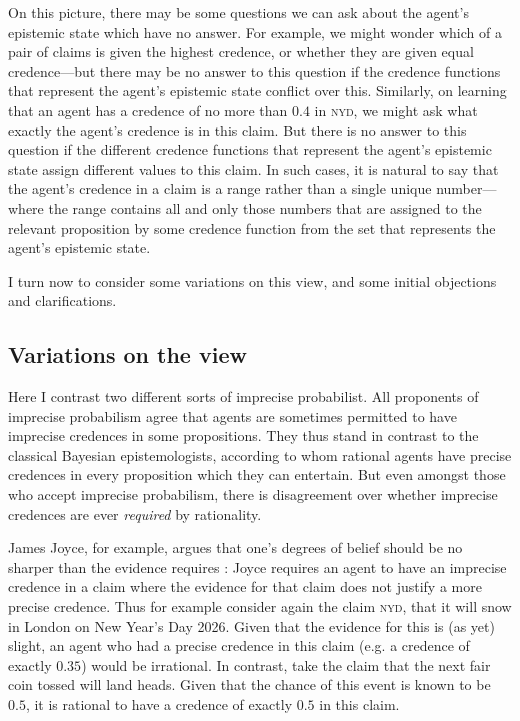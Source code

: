 On this picture, there may be some questions we can ask about the agent's epistemic state which have no answer. For example, we might wonder which of a pair of claims is given the highest credence, or whether they are given equal credence---but there may be no answer to this question if the credence functions that represent the agent's epistemic state conflict over this. Similarly, on learning that an agent has a credence of no more than $0.4$ in \textsc{nyd}, we might ask what exactly the agent's credence is in this claim. But there is no answer to this question if the different credence functions that represent the agent's epistemic state assign different values to this claim. In such cases, it is natural to say that the agent's credence in a claim is a range rather than a single unique number---where the range contains all and only those numbers that are assigned to the relevant proposition by some credence function from the set that represents the agent's epistemic state. 

I turn now to consider some variations on this view, and some initial objections and clarifications.

\subsection{Variations on the view}

Here I contrast two different sorts of imprecise probabilist. All proponents of imprecise probabilism agree that agents are sometimes permitted to have imprecise credences in some propositions. They thus stand in contrast to the classical Bayesian epistemologists, according to whom rational agents have precise credences in every proposition which they can entertain. But even amongst those who accept imprecise probabilism, there is disagreement over whether imprecise credences are ever \emph{required} by rationality. 

James Joyce, for example, argues that one's degrees of belief should be no sharper than the evidence requires \citep{Joyce2005}: Joyce requires an agent to have an imprecise credence in a claim where the evidence for that claim does not justify a more precise credence. Thus for example consider again the claim \textsc{nyd}, that it will snow in London on New Year's Day 2026. Given that the evidence for this is (as yet) slight, an agent who had a precise credence in this claim (e.g. a credence of exactly $0.35$) would be irrational. In contrast, take the claim that the next fair coin tossed will land heads. Given that the chance of this event is known to be $0.5$, it is rational to have a credence of exactly $0.5$ in this claim. 

